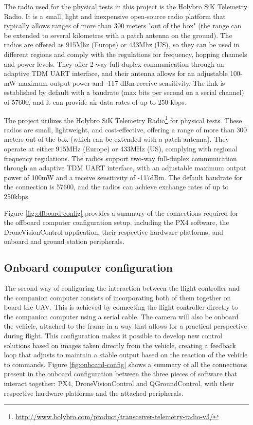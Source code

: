 The radio used for the physical tests in this project is the Holybro SiK Telemetry Radio.
It is a small, light and inexpensive open-source radio platform that typically allows ranges of more than 300 meters "out of the box" (the range can be extended to several kilometres with a patch antenna on the ground).
The radios are offered as 915Mhz (Europe) or 433Mhz (US), so they can be used in different regions and comply with the regulations for frequency, hopping channels and power levels.
They offer 2-way full-duplex communication through an adaptive TDM UART interface, and their antenna allows for an adjustable 100-mW-maximum output power and -117 dBm receive sensitivity.
The link is established by default with a baudrate (max bits per second on a serial channel) of 57600, and it can provide air data rates of up to 250 kbps.

The project utilizes the Holybro SiK Telemetry Radio\footnote{\url{http://www.holybro.com/product/transceiver-telemetry-radio-v3/}} for physical tests. These radios are small, lightweight, and cost-effective, offering a range of more than 300 meters out of the box (which can be extended with a patch antenna). They operate at either 915MHz (Europe) or 433MHz (US), complying with regional frequency regulations. The radios support two-way full-duplex communication through an adaptive TDM UART interface, with an adjustable maximum output power of 100mW and a receive sensitivity of -117dBm. The default baudrate for the connection is 57600, and the radios can achieve exchange rates of up to 250kbps.

Figure \ref{fig:offboard-config} provides a summary of the connections required for the offboard computer configuration setup, including the PX4 software, the DroneVisionControl application, their respective hardware platforms, and onboard and ground station peripherals.


\subsection{Onboard computer configuration}
\label{subsec:onboard}

The second way of configuring the interaction between the flight controller and the companion computer consists of incorporating both of them together on board the UAV.
This is achieved by connecting the flight controller directly to the companion computer using a serial cable.
The camera will also be onboard the vehicle, attached to the frame in a way that allows for a practical perspective during flight.
This configuration makes it possible to develop new control solutions based on images taken directly from the vehicle, creating a feedback loop that adjusts to maintain a stable output based on the reaction of the vehicle to commands.
Figure \ref{fig:onboard-config} shows a summary of all the connections present in the onboard configuration between the three pieces of software that interact together: PX4, DroneVisionControl and QGroundControl, with their respective hardware platforms and the attached peripherals.

